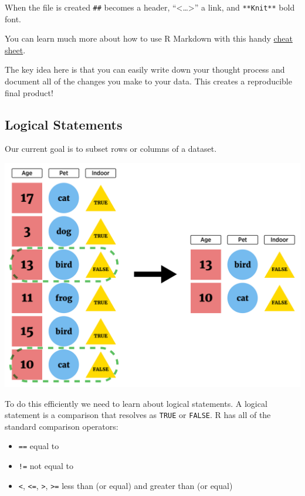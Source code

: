 \documentclass[
]{book}
\providecommand{\tightlist}{%
  \setlength{\itemsep}{0pt}\setlength{\parskip}{0pt}}
\theoremstyle{definition}
\theoremstyle{definition}
\theoremstyle{definition}
\theoremstyle{remark}
\begin{document}
When the file is created \texttt{\#\#} becomes a header, ``\textless{}\ldots{}\textgreater{}'' a link, and \texttt{**Knit**} bold font.

You can learn much more about how to use R Markdown with this handy \href{https://www.rstudio.com/wp-content/uploads/2015/03/rmarkdown-reference.pdf}{cheat sheet}.

The key idea here is that you can easily write down your thought process and document all of the changes you make to your data. This creates a reproducible final product!

\hypertarget{logical-statements}{%
\subsection{Logical Statements}\label{logical-statements}}

Our current goal is to subset rows or columns of a dataset.

\begin{center}\includegraphics[width=0.8\linewidth]{img/filterVisualF} \end{center}

To do this efficiently we need to learn about logical statements. A logical statement is a comparison that resolves as \texttt{TRUE} or \texttt{FALSE}. R has all of the standard comparison operators:

\begin{itemize}
\tightlist
\item
  \texttt{==} equal to
\item
  \texttt{!=} not equal to
\item
  \texttt{\textless{}}, \texttt{\textless{}=}, \texttt{\textgreater{}}, \texttt{\textgreater{}=} less than (or equal) and greater than (or equal)
\end{itemize}
\end{document}
